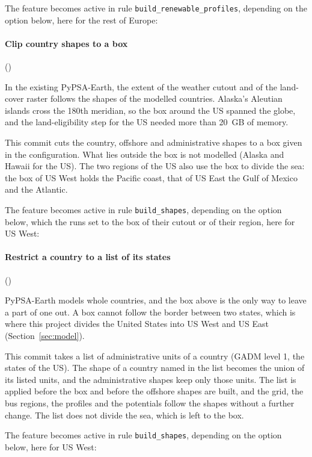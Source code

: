The feature becomes active in rule \texttt{build\_renewable\_profiles}, depending on the option below, here for the rest of Europe:

\paragraph{Clip country shapes to a box} ()

In the existing PyPSA-Earth, the extent of the weather cutout and of the land-cover raster follows the shapes of the modelled countries.
Alaska's Aleutian islands cross the 180th meridian, so the box around the US spanned the globe, and the land-eligibility step for the US needed more than \SI{20}{GB} of memory.

This commit cuts the country, offshore and administrative shapes to a box given in the configuration.
What lies outside the box is not modelled (Alaska and Hawaii for the US).
The two regions of the US also use the box to divide the sea: the box of US West holds the Pacific coast, that of US East the Gulf of Mexico and the Atlantic.

The feature becomes active in rule \texttt{build\_shapes}, depending on the option below, which the runs set to the box of their cutout or of their region, here for US West:

\paragraph{Restrict a country to a list of its states} ()

PyPSA-Earth models whole countries, and the box above is the only way to leave a part of one out.
A box cannot follow the border between two states, which is where this project divides the United States into US West and US East (Section~\ref{sec:model}).

This commit takes a list of administrative units of a country (GADM level 1, the states of the US).
The shape of a country named in the list becomes the union of its listed units, and the administrative shapes keep only those units.
The list is applied before the box and before the offshore shapes are built, and the grid, the bus regions, the profiles and the potentials follow the shapes without a further change.
The list does not divide the sea, which is left to the box.

The feature becomes active in rule \texttt{build\_shapes}, depending on the option below, here for US West:

